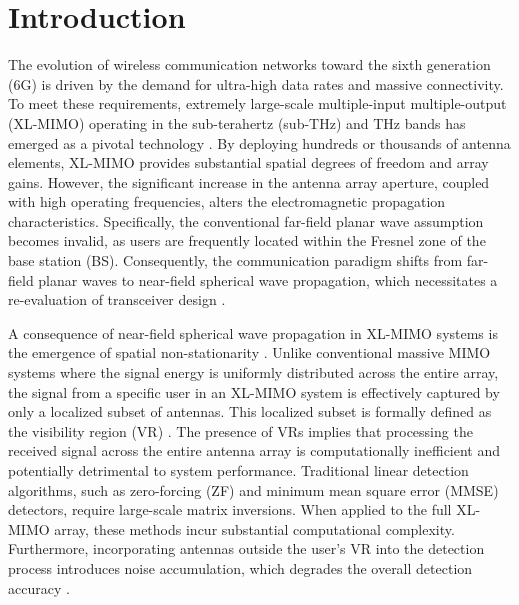 \section{Introduction}

The evolution of wireless communication networks toward the sixth generation (6G) is driven by the demand for ultra-high data rates and massive connectivity. To meet these requirements, extremely large-scale multiple-input multiple-output (XL-MIMO) operating in the sub-terahertz (sub-THz) and THz bands has emerged as a pivotal technology \cite{lu2024tutorial, amiri2018extremely}. By deploying hundreds or thousands of antenna elements, XL-MIMO provides substantial spatial degrees of freedom and array gains. However, the significant increase in the antenna array aperture, coupled with high operating frequencies, alters the electromagnetic propagation characteristics. Specifically, the conventional far-field planar wave assumption becomes invalid, as users are frequently located within the Fresnel zone of the base station (BS). Consequently, the communication paradigm shifts from far-field planar waves to near-field spherical wave propagation, which necessitates a re-evaluation of transceiver design \cite{zhi2024performance, lu2024hybrid}.

A consequence of near-field spherical wave propagation in XL-MIMO systems is the emergence of spatial non-stationarity \cite{iimori2022grant}. Unlike conventional massive MIMO systems where the signal energy is uniformly distributed across the entire array, the signal from a specific user in an XL-MIMO system is effectively captured by only a localized subset of antennas. This localized subset is formally defined as the visibility region (VR) \cite{tang2024joint, xu2024joint}. The presence of VRs implies that processing the received signal across the entire antenna array is computationally inefficient and potentially detrimental to system performance. Traditional linear detection algorithms, such as zero-forcing (ZF) and minimum mean square error (MMSE) detectors, require large-scale matrix inversions. When applied to the full XL-MIMO array, these methods incur substantial computational complexity. Furthermore, incorporating antennas outside the user's VR into the detection process introduces noise accumulation, which degrades the overall detection accuracy \cite{zhi2024performance}.

